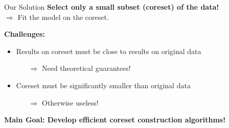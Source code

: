 \documentclass[gray]{beamer}
\begin{document}

\begin{frame}{Our Solution} \pause
    \textbf{Select only a small subset (coreset) of the data!} \\
    $\Rightarrow$ Fit the model on the coreset.

    \pause

    \vspace{\fill}

    \textbf{Challenges:}
    \begin{itemize}
        \item Results on coreset must be close to results on original data
              \begin{itemize}
                  \item[$\Rightarrow$] Need theoretical guarantees!
              \end{itemize}
        \item Coreset must be significantly smaller than original data
              \begin{itemize}
                  \item[$\Rightarrow$] Otherwise useless!
              \end{itemize}
    \end{itemize}

    \pause

    \vspace{\fill}

    \textbf{Main Goal: Develop efficient coreset construction algorithms!}
\end{frame}
\end{document}
